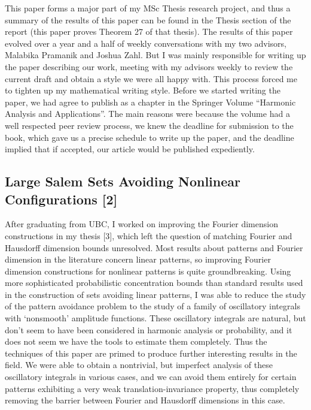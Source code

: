\documentclass[12pt]{article}
\theoremstyle{plain}
\theoremstyle{remark}
\theoremstyle{definition}
\begin{document}
This paper forms a major part of my MSc Thesis research project, and thus a summary of the results of this paper can be found in the Thesis section of the report (this paper proves Theorem 27 of that thesis). The results of this paper evolved over a year and a half of weekly conversations with my two advisors, Malabika Pramanik and Joshua Zahl. But I was mainly responsible for writing up the paper describing our work, meeting with my advisors weekly to review the current draft and obtain a style we were all happy with. This process forced me to tighten up my mathematical writing style. Before we started writing the paper, we had agree to publish as a chapter in the Springer Volume ``Harmonic Analysis and Applications''. The main reasons were because the volume had a well respected peer review process, we knew the deadline for submission to the book, which gave us a precise schedule to write up the paper, and the deadline implied that if accepted, our article would be published expediently.

\subsection*{Large Salem Sets Avoiding Nonlinear Configurations [2]}

After graduating from UBC, I worked on improving the Fourier dimension constructions in my thesis [3], which left the question of matching Fourier and Hausdorff dimension bounds unresolved. Most results about patterns and Fourier dimension in the literature concern linear patterns, so improving Fourier dimension constructions for nonlinear patterns is quite groundbreaking. Using more sophisticated probabilistic concentration bounds than standard results used in the construction of sets avoiding linear patterns, I was able to reduce the study of the pattern avoidance problem to the study of a family of oscillatory integrals with `nonsmooth' amplitude functions. These oscillatory integrals are natural, but don't seem to have been considered in harmonic analysis or probability, and it does not seem we have the tools to estimate them completely. Thus the techniques of this paper are primed to produce further interesting results in the field. We were able to obtain a nontrivial, but imperfect analysis of these oscillatory integrals in various cases, and we can avoid them entirely for certain patterns exhibiting a very weak translation-invariance property, thus completely removing the barrier between Fourier and Hausdorff dimensions in this case.
\end{document}
